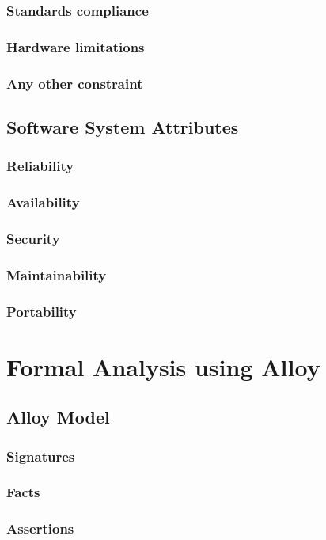 \documentclass[a4paper,11pt]{report}
\begin{document}
\subsection{Standards compliance}
\subsection{Hardware limitations}
\subsection{Any other constraint}

\section{Software System Attributes}
\subsection{Reliability}
\subsection{Availability}
\subsection{Security}
\subsection{Maintainability}
\subsection{Portability}


\chapter{Formal Analysis using Alloy}

\section{Alloy Model}
\subsection{Signatures}
\subsection{Facts}
\subsection{Assertions}
\end{document}
